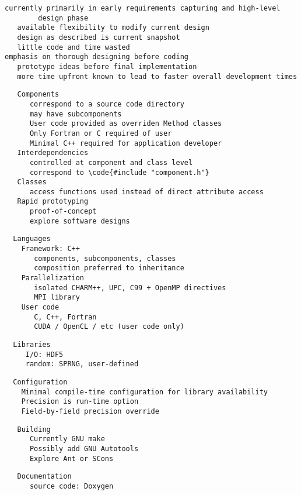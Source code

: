 \documentclass{article}
\begin{document}
\begin{verbatim}
currently primarily in early requirements capturing and high-level 
        design phase
   available flexibility to modify current design
   design as described is current snapshot
   little code and time wasted
emphasis on thorough designing before coding
   prototype ideas before final implementation
   more time upfront known to lead to faster overall development times
\end{verbatim}

\begin{verbatim}
   Components
      correspond to a source code directory
      may have subcomponents
      User code provided as overriden Method classes
      Only Fortran or C required of user
      Minimal C++ required for application developer
   Interdependencies  
      controlled at component and class level
      correspond to \code{#include "component.h"}
   Classes
      access functions used instead of direct attribute access
   Rapid prototyping
      proof-of-concept
      explore software designs
\end{verbatim}

\begin{verbatim}
  Languages
    Framework: C++
       components, subcomponents, classes
       composition preferred to inheritance
    Parallelization
       isolated CHARM++, UPC, C99 + OpenMP directives
       MPI library
    User code
       C, C++, Fortran 
       CUDA / OpenCL / etc (user code only)
\end{verbatim}

\begin{verbatim}
  Libraries
     I/O: HDF5
     random: SPRNG, user-defined
\end{verbatim}

\begin{verbatim}
  Configuration
    Minimal compile-time configuration for library availability
    Precision is run-time option
    Field-by-field precision override
\end{verbatim}

\begin{verbatim}
   Building
      Currently GNU make
      Possibly add GNU Autotools
      Explore Ant or SCons
\end{verbatim}


\begin{verbatim}
   Documentation
      source code: Doxygen
\end{verbatim}
\end{document}
